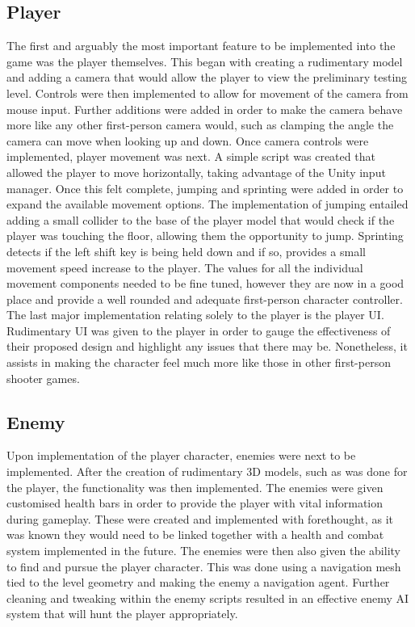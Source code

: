\documentclass[11pt]{article}
\begin{document}
\subsection{Player}
The first and arguably the most important feature to be implemented into the game was the player themselves. This began with creating a rudimentary model and adding a camera that would allow the player to view the preliminary testing level. Controls were then implemented to allow for movement of the camera from mouse input. Further additions were added in order to make the camera behave more like any other first-person camera would, such as clamping the angle the camera can move when looking up and down. 
Once camera controls were implemented, player movement was next. A simple script was created that allowed the player to move horizontally, taking advantage of the Unity input manager. Once this felt complete, jumping and sprinting were added in order to expand the available movement options. The implementation of jumping entailed adding a small collider to the base of the player model that would check if the player was touching the floor, allowing them the opportunity to jump. Sprinting detects if the left shift key is being held down and if so, provides a small movement speed increase to the player. The values for all the individual movement components needed to be fine tuned, however they are now in a good place and provide a well rounded and adequate first-person character controller. 
The last major implementation relating solely to the player is the player UI. Rudimentary UI was given to the player in order to gauge the effectiveness of their proposed design and highlight any issues that there may be. Nonetheless, it assists in making the character feel much more like those in other first-person shooter games. \\

\subsection{Enemy}
Upon implementation of the player character, enemies were next to be implemented. After the creation of rudimentary 3D models, such as was done for the player, the functionality was then implemented. The enemies were given customised health bars in order to provide the player with vital information during gameplay. These were created and implemented with forethought, as it was known they would need to be linked together with a health and combat system implemented in the future.
The enemies were then also given the ability to find and pursue the player character. This was done using a navigation mesh tied to the level geometry and making the enemy a navigation agent. Further cleaning and tweaking within the enemy scripts resulted in an effective enemy AI system that will hunt the player appropriately. \\
\end{document}
